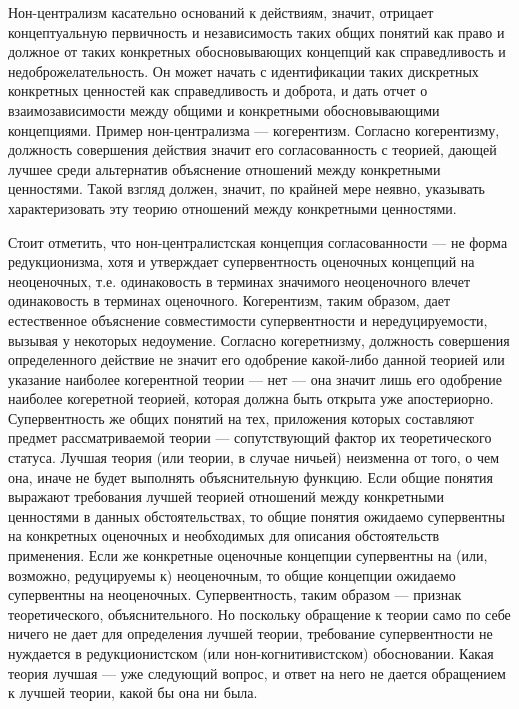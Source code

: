 \documentclass[11pt]{book}
\begin{document}
Нон-централизм касательно оснований к действиям, значит, отрицает концептуальную первичность и независимость таких общих понятий как право и должное от таких конкретных обосновывающих концепций как справедливость и недоброжелательность. Он может начать с идентификации таких дискретных конкретных ценностей как справедливость и доброта, и дать отчет о взаимозависимости между общими и конкретными обосновывающими концепциями. Пример нон-централизма --- когерентизм. Согласно когерентизму, должность совершения действия значит его согласованность с теорией, дающей лучшее среди альтернатив объяснение отношений между конкретными ценностями. Такой взгляд должен, значит, по крайней мере неявно, указывать характеризовать эту теорию отношений между конкретными ценностями.

Стоит отметить, что нон-централистская концепция согласованности --- не форма редукционизма, хотя и утверждает супервентность оценочных концепций на неоценочных, т.е. одинаковость в терминах значимого неоценочного влечет одинаковость в терминах оценочного. Когерентизм, таким образом, дает естественное объяснение совместимости супервентности и нередуцируемости, вызывая у некоторых недоумение. Согласно когеретнизму, должность совершения определенного действие не значит его одобрение какой-либо данной теорией или указание наиболее когерентной теории --- нет --- она значит лишь его одобрение наиболее когеретной теорией, которая должна быть открыта уже апостериорно. Супервентность же общих понятий на тех, приложения которых составляют предмет рассматриваемой теории --- сопутствующий фактор их теоретического статуса. Лучшая теория (или теории, в случае ничьей) неизменна от того, о чем она, иначе не будет выполнять объяснительную функцию. Если общие понятия выражают требования лучшей теорией отношений между конкретными ценностями в данных обстоятельствах, то общие понятия ожидаемо супервентны на конкретных оценочных и необходимых для описания обстоятельств применения. Если же конкретные оценочные концепции супервентны на (или, возможно, редуцируемы к) неоценочным, то общие концепции ожидаемо супервентны на неоценочных. Супервентность, таким образом --- признак теоретического, объяснительного. Но поскольку обращение к теории само по себе ничего не дает для определения лучшей теории, требование супервентности не нуждается в редукционистском (или нон-когнитивистском) обосновании. Какая теория лучшая --- уже следующий вопрос, и ответ на него не дается обращением к лучшей теории, какой бы она ни была.
\end{document}
